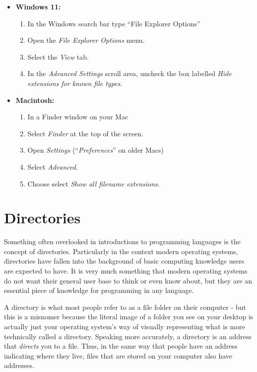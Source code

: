 \begin{itemize}
    \item \textbf{Windows 11:} 
    \begin{enumerate}
    \sffamily\setlength\itemsep{-1em}
        \item In the Windows search bar type ``File Explorer Options''
        \item Open the \textit{File Explorer Options} menu. 
        \item Select the \textit{View} tab. 
        \item In the \textit{Advanced Settings} scroll area, uncheck the box labelled \textit{Hide extensions for known file types}.
    \end{enumerate}

    \item \textbf{Macintosh:} 
    \begin{enumerate}
    \sffamily\setlength\itemsep{-1em}
        \item In a Finder window on your Mac
        \item Select \textit{Finder} at the top of the screen.
        \item Open \textit{Settings} (``\textit{Preferences}'' on older Macs)
        \item Select \textit{Advanced}. 
        \item Choose select \textit{Show all filename extensions}.
    \end{enumerate}

\end{itemize}


\section{Directories}
\label{sec:dir}

Something often overlooked in introductions to programming languages is the concept of directories. Particularly in the context modern operating systems, directories have fallen into the background of basic computing knowledge users are expected to have. It is very much something that modern operating systems do not want their general user base to think or even know about, but they are an essential piece of knowledge for programming in any language.

A \gls{directory} is what most people refer to as a file folder on their computer - but this is a misnomer because the literal image of a folder you see on your desktop is actually just your operating system's way of visually representing what is more technically called a directory. Speaking more accurately, a directory is an address that \textit{directs} you to a file. Thus, in the same way that people have an address indicating where they live, files that are stored on your computer also have addresses.


